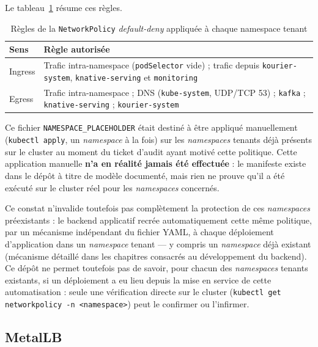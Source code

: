 Le tableau~\ref{tab:networkpolicy-rules} résume ces règles.

\begin{table}[!ht]
\begin{center}
     \begin{tabular}{|l{3cm}|l{9cm}|}
     \hline
     \textbf{Sens} & \textbf{Règle autorisée} \\
     \hline
     Ingress & Trafic intra-namespace (\texttt{podSelector} vide) ; trafic depuis \texttt{kourier-system}, \texttt{knative-serving} et \texttt{monitoring} \\
     \hline
     Egress & Trafic intra-namespace ; DNS (\texttt{kube-system}, UDP/TCP 53) ; \texttt{kafka} ; \texttt{knative-serving} ; \texttt{kourier-system} \\
     \hline
     \end{tabular}
     \caption{Règles de la \texttt{NetworkPolicy} \textit{default-deny} appliquée à chaque namespace tenant}
     \label{tab:networkpolicy-rules}
     \end{center}
\end{table}

Ce fichier \texttt{NAMESPACE\_PLACEHOLDER} était destiné à être appliqué manuellement (\texttt{kubectl apply}, un \textit{namespace} à la fois) sur les \textit{namespaces} tenants déjà présents sur le cluster au moment du ticket d'audit ayant motivé cette politique. Cette application manuelle \textbf{n'a en réalité jamais été effectuée} : le manifeste existe dans le dépôt à titre de modèle documenté, mais rien ne prouve qu'il a été exécuté sur le cluster réel pour les \textit{namespaces} concernés.

Ce constat n'invalide toutefois pas complètement la protection de ces \textit{namespaces} préexistants : le backend applicatif recrée automatiquement cette même politique, par un mécanisme indépendant du fichier YAML, à chaque déploiement d'application dans un \textit{namespace} tenant — y compris un \textit{namespace} déjà existant (mécanisme détaillé dans les chapitres consacrés au développement du backend). Ce dépôt ne permet toutefois pas de savoir, pour chacun des \textit{namespaces} tenants existants, si un déploiement a eu lieu depuis la mise en service de cette automatisation : seule une vérification directe sur le cluster (\texttt{kubectl get networkpolicy -n <namespace>}) peut le confirmer ou l'infirmer.

\subsection{MetalLB}


